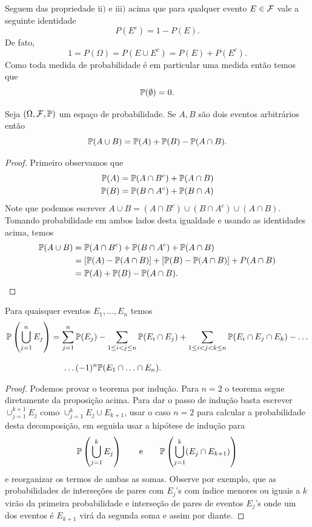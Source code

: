 Seguem das propriedade $\textrm{ii})$ e $\textrm{iii})$ acima que 
para qualquer evento $E\in\F$ vale a seguinte identidade
	\[
		P(E^c)=1-P(E).
	\]
De fato, 
	\[
		1=P(\Omega)= P(E\cup E^c)=P(E)+P(E^c).
	\]
Como toda medida de probabilidade é em particular uma medida então 
temos que 
	\[
		\P(\emptyset)=0.
	\] 
\begin{proposicao} Seja $(\Omega,\F,\P)$ um espaço de probabilidade.
Se $A,B$ são dois eventos arbitrários então 
	\[
		\P(A\cup B) = \P(A)+\P(B)-\P(A\cap B).
	\]
\end{proposicao}
\begin{proof}
Primeiro observamos que 
%	
	\begin{align*}
		\P(A) = \P(A\cap B^c)+\P(A\cap B) 
		\\
		\P(B) = \P(B\cap A^c)+\P(B\cap A) 
	\end{align*}
Note que podemos escrever $A\cup B = (A\cap B^c) \cup (B\cap A^c) \cup (A\cap B)$.
Tomando probabilidade em ambos lados desta igualdade 
e usando as identidades acima, temos
	\begin{align*}
	\P(A\cup B) 
	&=
	\P(A\cap B^c) + \P(B\cap A^c) + \P(A\cap B)
	\\
	&=
	[\P(A)-\P(A\cap B)] + [\P(B)-\P(A\cap B)] + P(A\cap B)
	\\
	&=
	\P(A)+\P(B)-\P(A\cap B).
	\end{align*}


\end{proof}

\begin{teorema}
Para quaisquer eventos $E_1,\ldots,E_n$ temos 
	\begin{align*}
		\P\left( \bigcup_{j=1}^{n} E_j \right)
		&=
		\sum_{j=1}^n \P(E_j)
		-
		\sum_{1\leq i<j\leq n} \P(E_i\cap E_j) 
		+
		\sum_{1\leq i<j<k\leq n} \P(E_i\cap E_j\cap E_k)-\ldots
		\\[0.3cm]
		&\hspace*{0.5cm} \ldots(-1)^n \P(E_1\cap\ldots\cap E_n).
	\end{align*}
\end{teorema}

\begin{proof}
 Podemos provar o teorema por indução. Para $n=2$ o teorema
 segue diretamente da proposição acima. Para dar o passo de 
 indução basta escrever $\cup_{j=1}^{k+1} E_j$ 
 como $\cup_{j=1}^{k}E_j\cup E_{k+1}$, usar o caso $n=2$ 
 para calcular a probabilidade desta decomposição, em seguida usar 
 a hipótese de indução para 
 \[	
 \P \left( \bigcup_{j=1}^{k} E_j \right)
 \qquad
 \text{e}
 \qquad
 \P \left( \bigcup_{j=1}^{k} (E_j\cap E_{k+1}) \right)
 \]
 e reorganizar os termos de ambas as somas. Observe 
 por exemplo, que as probabilidades de interseções de pares 
 com $E_j$'s com índice menores ou iguais a $k$ virão 
 da primeira probabilidade e interseção de pares de
 eventos $E_j$'s onde um dos eventos é $E_{k+1}$ virá 
 da segunda soma e assim por diante.
\end{proof}

